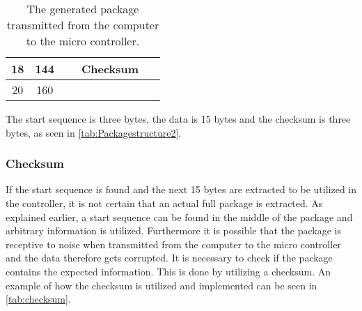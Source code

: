 \begin{table}[H]
\begin{tabular}{llclllllllllllllll}
\multicolumn{1}{|c|}{18}   & \multicolumn{1}{c|}{144} & \multicolumn{16}{c|}{Checksum}                                                       \\ \hline
\multicolumn{1}{|c|}{20}   & \multicolumn{1}{c|}{160} & \multicolumn{8}{c|}{}                                                                                                                                                                                 & \multicolumn{1}{c|}{}  & \multicolumn{1}{c|}{}  & \multicolumn{1}{c|}{}   & \multicolumn{1}{c|}{}   & \multicolumn{1}{c|}{}   & \multicolumn{1}{c|}{}   & \multicolumn{1}{c|}{}   & \multicolumn{1}{c|}{}   \\ \hline
\end{tabular}
\caption{The generated package transmitted from the computer to the micro controller.}
\label{tab:Packagestructure2}
\end{table}

The start sequence is three bytes, the data is 15 bytes and the checksum is three bytes, as seen in \autoref{tab:Packagestructure2}.
\subsubsection{Checksum}
If the start sequence is found and the next 15 bytes are extracted to be utilized in the controller, it is not certain that an actual full package is extracted. As explained earlier, a start sequence can be found in the middle of the package and arbitrary information is utilized. Furthermore it is possible that the package is receptive to noise when transmitted from the computer to the micro controller and the data therefore gets corrupted. It is necessary to check if the package contains the expected information. This is done by utilizing a checksum. An example of how the checksum is utilized and implemented can be seen in \autoref{tab:checksum}.  

